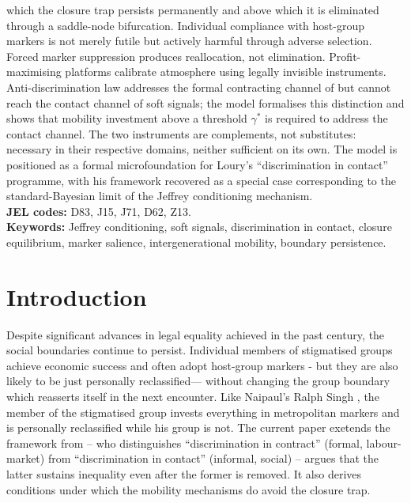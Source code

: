 \documentclass[12pt,a4paper]{article}
\theoremstyle{definition}
\numberwithin{proposition}{subsection}
\begin{document}
\begin{center}
\begin{minipage}{0.85\textwidth}
which the closure trap persists permanently and above which it is
eliminated through a saddle-node bifurcation. Individual
compliance with host-group markers is not merely futile but
actively harmful through adverse selection. Forced marker
suppression produces reallocation, not elimination. Profit-maximising
platforms calibrate atmosphere using legally invisible instruments.
Anti-discrimination law addresses the formal contracting channel of
\citet{Loury2002} but cannot reach the contact channel of soft
signals; the model formalises this distinction and shows that
mobility investment above a threshold $\gamma^*$ is required to
address the contact channel. The two instruments are complements,
not substitutes: necessary in their respective domains, neither
sufficient on its own. The model is positioned as a formal
microfoundation for Loury's ``discrimination in contact''
programme, with his framework recovered as a special case
corresponding to the standard-Bayesian limit of the Jeffrey
conditioning mechanism.\\[0.5em]

\noindent\textbf{JEL codes:} D83, J15, J71, D62, Z13.\\
\textbf{Keywords:} Jeffrey conditioning, soft signals,
discrimination in contact, closure equilibrium, marker salience,
intergenerational mobility, boundary persistence.
\end{minipage}
\end{center}


\section{Introduction}
\label{sec:intro}

Despite significant advances in legal equality achieved in the past century, the social boundaries continue to persist. Individual members of stigmatised groups achieve economic success and often adopt host-group markers - but they are also likely to be just personally reclassified--- without changing the group boundary
which reasserts itself in the next encounter. Like Naipaul's Ralph Singh \citep{Naipaul1967}, the member of the stigmatised group invests everything in metropolitan markers and
is personally reclassified while his group is not. The current paper exetends the framework from \citet{Loury2002} -- who
distinguishes ``discrimination in contract'' (formal,
labour-market) from ``discrimination in contact'' (informal,
social) -- argues that the latter sustains inequality even after
the former is removed. It also derives conditions under which the mobility mechanisms do avoid the closure trap.
\end{document}
